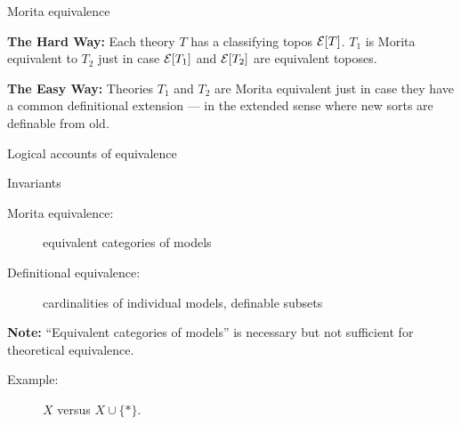 \documentclass{beamer}
\begin{document}
\begin{frame}{Morita equivalence}

\textbf{The Hard Way:} Each theory $T$ has a classifying topos $\mathcal E
[T]$.  $T_1$ is Morita equivalent to $T_2$ just in case $\mathcal E [T_1]$
and $\mathcal E [T_2]$ are equivalent toposes.

\bigskip \textbf{The Easy Way:} Theories $T_1$ and $T_2$ are Morita
equivalent just in case they have a common definitional extension ---
in the extended sense where new sorts are definable from old.

\end{frame}

\begin{frame}{Logical accounts of equivalence}


\end{frame}

\begin{frame}{Invariants}

\begin{description}
\item[Morita equivalence:] equivalent categories of models
\item[Definitional equivalence:] cardinalities of individual models,
  definable subsets
\end{description}


\bigskip \textbf{Note:} ``Equivalent categories of models'' is
necessary but not sufficient for theoretical equivalence. \newline
\begin{description}
\item[Example:] $X$ versus $X\cup \{ \ast \}$. \end{description}

\end{frame}
\end{document}
